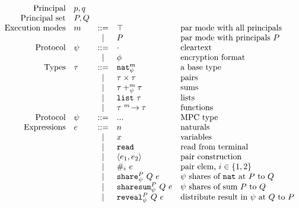 \documentclass[10pt]{article}
\newcommand{\kw}[1]{\ensuremath{\mathtt{#1}}}
\newcommand{\tnat}{\ensuremath{\mathtt{nat}}}
\newcommand{\tlist}[1]{\ensuremath{\mathtt{list}~{#1}}}
\newcommand{\tfun}[3]{\ensuremath{{#1} ~^{#3}\!\rightarrow {#2}}}
\newcommand{\tprod}[2]{\ensuremath{{#1} \times {#2}}}
\newcommand{\tsum}[4]{\ensuremath{{#1} +^{#3}_{#4} {#2}}}
\newcommand{\isec}{\ensuremath{\mathtt{pmap}}}
\newcommand{\ereveal}[4]{\ensuremath{\kw{reveal}^{#1}_{#4}~{#2}~{#3}}}
\newcommand{\eshare}[4]{\ensuremath{\kw{share}^{#2}_{#1}~{#3}~{#4}}}
\newcommand{\esharesum}[4]{\ensuremath{\kw{sharesum}^{#2}_{#1}~{#3}~{#4}}}
\newcommand{\econcat}[2]{\ensuremath{{#1} +\!\!+~ {#2}}}
\newcommand{\eaccval}[2]{\ensuremath{{#1}.{#2}}}
\newcommand{\eread}{\ensuremath{\kw{read}}}
\newcommand{\epair}[2]{\ensuremath{\langle {#1}, {#2} \rangle}}
\newcommand{\eproj}[2]{\ensuremath{\kw{\#}}_{#1}~{#2}}
\begin{document}
\begin{figure}[h]
  \centering
  \[\begin{array}{rlcll}
      \text{Principal} & p, q \\
      \text{Principal set} & P, Q \\
    \text{Execution modes} & m  & ::=  & \top & \text{par mode with all principals}\\
                       && \mid & P & \text{par mode with principals $P$} \\
      \text{Protocol} & \psi & ::= & \cdot & \text{cleartext} \\
                       && \mid & \phi & \text{encryption format} \\
      \text{Types} & \tau & ::=  & \tnat^m_\psi & \text{a base type} \\
                       && \mid & \tprod{\tau}{\tau} & \text{pairs} \\
                       && \mid & \tsum{\tau}{\tau}{m}{\psi} & \text{sums} \\
                       && \mid & \tlist{\tau} & \text{lists} \\
                       && \mid & \tfun{\tau}{\tau}{m} & \text{functions} \\
      \text{Protocol} & \psi & ::= & ... & \text{MPC type} \\
      \text{Expressions} & e & ::= & n & \text{naturals} \\
                       && \mid & x & \text{variables} \\
                       && \mid & \eread & \text{read from terminal}\\
                       && \mid & \epair{e_1}{e_2} & \text{pair construction}\\
                       && \mid & \eproj{i}{e} & \text{pair elem, }i \in \{1,2\}\\
                       && \mid & \eshare{\psi}{P}{Q}{e} & \text{$\psi$ shares of {\tnat} at $P$ to $Q$} \\
                       && \mid & \esharesum{\psi}{P}{Q}{e} & \text{$\psi$ shares of sum $P$ to $Q$} \\
                       && \mid & \ereveal{P}{Q}{e}{\psi} & \text{distribute result in $\psi$ at $Q$ to $P$}\\

\end{array}\]
\end{figure}
\end{document}
